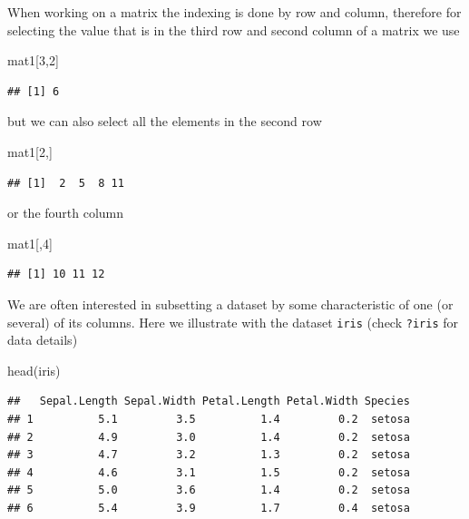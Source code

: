 \documentclass[
]{article}
\newenvironment{Shaded}{\begin{snugshade}}{\end{snugshade}}
\newcommand{\DecValTok}[1]{\textcolor[rgb]{0.00,0.00,0.81}{#1}}
\newcommand{\FunctionTok}[1]{\textcolor[rgb]{0.00,0.00,0.00}{#1}}
\newcommand{\NormalTok}[1]{#1}
\begin{document}
When working on a matrix the indexing is done by row and column,
therefore for selecting the value that is in the third row and second
column of a matrix we use

\begin{Shaded}
\begin{Highlighting}[]
\NormalTok{mat1[}\DecValTok{3}\NormalTok{,}\DecValTok{2}\NormalTok{]}
\end{Highlighting}
\end{Shaded}

\begin{verbatim}
## [1] 6
\end{verbatim}

\noindent but we can also select all the elements in the second row

\begin{Shaded}
\begin{Highlighting}[]
\NormalTok{mat1[}\DecValTok{2}\NormalTok{,]}
\end{Highlighting}
\end{Shaded}

\begin{verbatim}
## [1]  2  5  8 11
\end{verbatim}

or the fourth column

\begin{Shaded}
\begin{Highlighting}[]
\NormalTok{mat1[,}\DecValTok{4}\NormalTok{]}
\end{Highlighting}
\end{Shaded}

\begin{verbatim}
## [1] 10 11 12
\end{verbatim}

We are often interested in subsetting a dataset by some characteristic
of one (or several) of its columns. Here we illustrate with the dataset
\texttt{iris} (check \texttt{?iris} for data details)

\begin{Shaded}
\begin{Highlighting}[]
\FunctionTok{head}\NormalTok{(iris)}
\end{Highlighting}
\end{Shaded}

\begin{verbatim}
##   Sepal.Length Sepal.Width Petal.Length Petal.Width Species
## 1          5.1         3.5          1.4         0.2  setosa
## 2          4.9         3.0          1.4         0.2  setosa
## 3          4.7         3.2          1.3         0.2  setosa
## 4          4.6         3.1          1.5         0.2  setosa
## 5          5.0         3.6          1.4         0.2  setosa
## 6          5.4         3.9          1.7         0.4  setosa
\end{verbatim}
\end{document}
